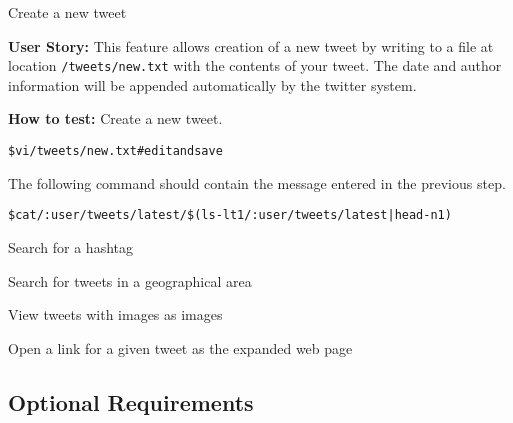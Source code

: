 \begin{Requirements}
\item Create a new tweet

\textbf{User Story:} This feature allows creation of a new tweet by writing to a
file at location \texttt{/tweets/new.txt} with the contents of your tweet. The
date and author information will be appended automatically by the twitter
system.

\textbf{How to test:} Create a new tweet.

\begin{alltt}
    \$ vi /tweets/new.txt  # edit and save
\end{alltt}

The following command should contain the message entered in the previous step.

\begin{alltt}
    \$ cat \texttt{/:user/tweets/latest/}\$(ls -lt1 \texttt{/:user/tweets/latest} | head -n 1)
\end{alltt}


\item Search for a hashtag
\item Search for tweets in a geographical area

\item View tweets with images as images
\item Open a link for a given tweet as the expanded web page

\end{Requirements}

\subsection{Optional Requirements}
